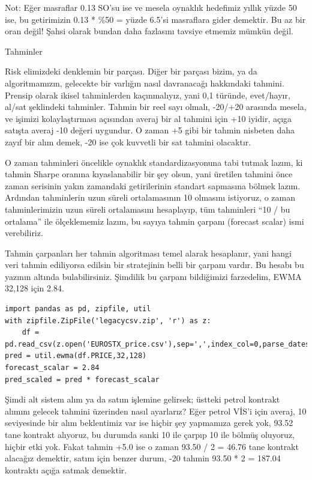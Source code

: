 \documentclass[12pt,fleqn]{article}\usepackage{../../common}
\begin{document}
Not: Eğer masraflar 0.13 SO'su ise ve mesela oynaklık hedefimiz yıllık yüzde 50
ise, bu getirimizin 0.13 * \%50 = yüzde 6.5'si masraflara gider demektir. Bu az
bir oran değil! Şahsi olarak bundan daha fazlasını tavsiye etmemiz mümkün değil.

Tahminler

Risk elimizdeki denklemin bir parçası. Diğer bir parçası bizim, ya da
algoritmamızın, gelecekte bir varlığın nasıl davranacağı hakkındaki
tahmini. Prensip olarak ikisel tahminlerden kaçınmalıyız, yani 0,1 türünde,
evet/hayır, al/sat şeklindeki tahminler. Tahmin bir reel sayı olmalı, -20/+20
arasında mesela, ve işimizi kolaylaştırması açısından averaj bir al tahmini için
+10 iyidir, açıga satışta averaj -10 değeri uygundur. O zaman +5 gibi bir tahmin
nisbeten daha zayıf bir alım demek, -20 ise çok kuvvetli bir sat tahmini
olacaktır.

O zaman tahminleri öncelikle oynaklık standardizasyonuna tabi tutmak lazım, ki
tahmin Sharpe oranına kıyaslanabilir bir şey olsun, yani üretilen tahmini önce
zaman serisinin yakın zamandaki getirilerinin standart sapmasına bölmek
lazım. Ardından tahminlerin uzun süreli ortalamasının 10 olmasını istiyoruz, o
zaman tahminlerimizin uzun süreli ortalamasını hesaplayıp, tüm tahminleri ``10 /
bu ortalama'' ile ölçeklememiz lazım, bu sayıya tahmin çarpanı (forecast scalar)
ismi verebiliriz.

Tahmin çarpanları her tahmin algoritması temel alarak hesaplanır, yani hangi
veri tahmin ediliyorsa edilsin bir stratejinin belli bir çarpanı vardır. Bu
hesabı bu yazının altında bulabilirsiniz. Şimdilik bu çarpanı bildiğimizi
farzedelim, EWMA 32,128 için 2.84.

\begin{verbatim}
import pandas as pd, zipfile, util
with zipfile.ZipFile('legacycsv.zip', 'r') as z:
    df =  pd.read_csv(z.open('EUROSTX_price.csv'),sep=',',index_col=0,parse_dates=True)
pred = util.ewma(df.PRICE,32,128)
forecast_scalar = 2.84
pred_scaled = pred * forecast_scalar
\end{verbatim}

Şimdi alt sistem alım ya da satım işlemine gelirsek; üstteki petrol kontrakt
alımını gelecek tahmini üzerinden nasıl ayarlarız? Eğer petrol VİS'i için
averaj, 10 seviyesinde bir alım beklentimiz var ise hiçbir şey yapmamıza gerek
yok, 93.52 tane kontrakt alıyoruz, bu durumda sanki 10 ile çarpıp 10 ile bölmüş
oluyoruz, hiçbir etki yok. Fakat tahmin +5.0 ise o zaman 93.50 / 2 = 46.76 tane
kontrakt alacağız demektir, satım için benzer durum, -20 tahmin 93.50 * 2 =
187.04 kontraktı açığa satmak demektir.
\end{document}
